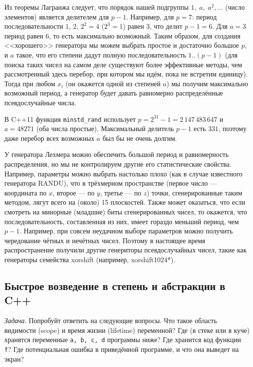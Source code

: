 \documentclass{book}
\begin{document}
Из теоремы Лагранжа следует, что порядок нашей подгруппы $1,\; a,\; a^2, ...$ (число элементов)
является делителем для $p - 1$. Например, для $p = 7$: период последовательности $1$, $2$, $2^2 =
4$ ($2^3 = 1$) равен $3$, что делит $p - 1 = 6$. Для $a = 3$ период равен $6$, то есть максимально
возможный.  Таким образом, для создания <<хорошего>> генератора мы можем выбрать простое и
достаточно большое $p$, и $a$ такое, что его степени дадут полную последовательность $1..(p - 1)$
(для поиска таких чисел на самом деле существуют более эффективные методы, чем рассмотренный здесь
перебор, при котором мы идём, пока не встретим единицу). Тогда при любом $x_i$ (он окажется одной
из степеней $a$) мы получим максимально возможный период, а генератор будет давать равномерно
распределённые псевдослучайные числа.

В C++11 функция \texttt{minstd_rand} использует $p = 2^{31} - 1 = 2\,147\,483\,647$ и $a =
48271$ (оба числа простые). Максимальный делитель $p - 1$ есть $331$, поэтому даже перебор всех
возможных $a$ был бы не очень долгим.

У генератора Лехмера можно обеспечить большой период и равномерность распределения, но мы не
контролируем другие его статистические свойства. Например, параметры
можно выбрать настолько плохо (как в случае известного генератора RANDU), что в трёхмерном пространстве (первое число --- координата
по $x$, второе --- по $y$, третье --- по $z$) точки, сгенерированные таким методом, лягут всего на (около) 15
плоскостей. Также может оказаться, что если смотреть на минорные (младшие) биты сгенерированных
чисел, то окажется, что последовательность, составленная из них, имеет гораздо меньший период, чем
$p - 1$. Например, при совсем неудачном выборе параметров можно получить чередование чётных и нечётных
чисел. Поэтому в настоящее время распространение получили другие генериторы псевдослучайных чисел,
такие
как генераторы семейства xorshift (например, xorshift1024*).

\subsection{Быстрое возведение в степень и абстракции в C++}

\clearpage

{\it Задача}. Попробуйт ответить на следующие вопросы. Что такое область видимости
(scope) и время жизни (lifetime) переменной? Где (в стеке или в куче) хранятся переменные
\texttt{a, b, c, d} программы ниже? Где хранится код функции \texttt{f}? Где
потенциальная ошибка в приведённой программе, и что она выведет на экран?
\end{document}
